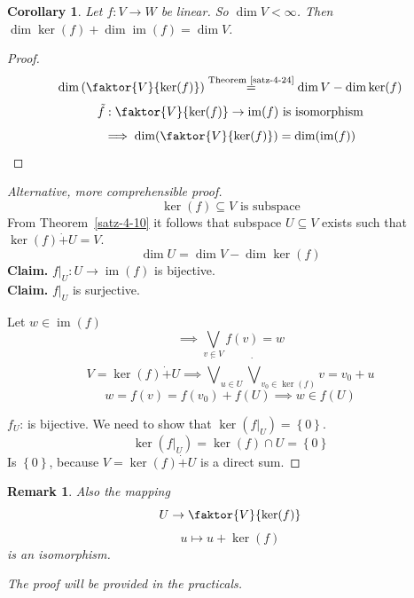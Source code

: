 \documentclass[a4paper,landscape,twocolumn]{article}
\newcommand\set[1]{\left\{#1\right\}}
\newtheorem{rem}{Remark}[section]
\newtheorem{cor}{Corollary}[section]
\DeclareMathOperator\image{im} %
\DeclareMathOperator\kernel{ker} %
\begin{document}
\begin{cor}
  \label{Korrolar-5-22}
  Let $f: V \rightarrow W$ be linear. So $\dim{V} < \infty$.
  Then $\dim{\kernel(f)} + \dim{\image(f)} = \dim{V}$.
\end{cor}
\begin{proof}
  \[ \dim\left(\faktor{V}{\kernel(f)}\right) \stackrel{\text{Theorem~\ref{satz-4-24}}}{=} \dim{V} - \dim{\kernel(f)} \]
  \[ \tilde{f}: \faktor{V}{\kernel(f)} \rightarrow \image(f) \text{ is isomorphism} \]
  \[ \implies \dim(\faktor{V}{\kernel(f)}) = \dim(\image(f)) \]
\end{proof}
\begin{proof}[Alternative, more comprehensible proof]
  \[ \kernel(f) \subseteq V \text{ is subspace} \]
  From Theorem~\ref{satz-4-10} it follows that subspace $U \subseteq V$ exists
  such that $\kernel(f) \dot{+} U = V$.
  \[ \dim{U} = \dim{V} - \dim{\kernel(f)} \]
  \textbf{Claim.} $f|_U: U \rightarrow \image(f)$ is bijective. \\
  \textbf{Claim.} $f|_U$ is surjective.

  Let $w \in \image(f)$
  \[ \implies \bigvee_{v \in V} f(v) = w \]
  \[ V = \kernel(f) \dot{+} U \implies \dot\bigvee_{u \in U} \dot\bigvee_{v_0 \in \kernel(f)} v = v_0 + u \]
  \[ w = f(v) = f(v_0) + f(U) \implies w \in f(U) \]

  $f_U$: is bijective. We need to show that $\kernel(f|_U) = \set{0}$.
  \[ \kernel(f|_U) = \kernel(f) \cap U = \set{0} \]
  Is $\set{0}$, because $V = \kernel(f) \dot{+} U$ is a direct sum.
\end{proof}
%
\begin{rem}
  Also the mapping
  \[ U \to \faktor{V}{\kernel(f)} \]
  \[ u \mapsto u + \kernel(f) \]
  is an isomorphism.

  The proof will be provided in the practicals.
\end{rem}
\end{document}
